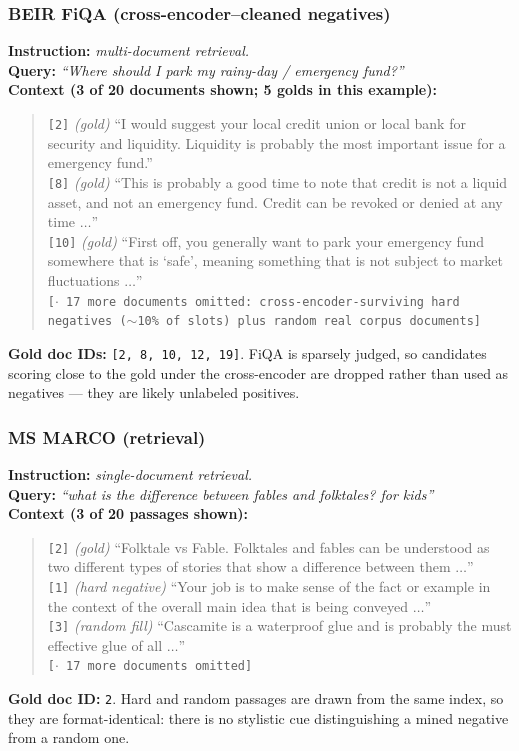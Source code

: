 \subsubsection{BEIR FiQA (cross-encoder--cleaned negatives)}

\textbf{Instruction:} \emph{multi-document retrieval.}\\
\textbf{Query:} \emph{``Where should I park my rainy-day / emergency fund?''}\\
\textbf{Context (3 of 20 documents shown; 5 golds in this example):}
\begin{quote}\small
\texttt{[2]} \emph{(gold)} ``I would suggest your local credit union or local bank for security and
liquidity. Liquidity is probably the most important issue for a emergency fund.''\\
\texttt{[8]} \emph{(gold)} ``This is probably a good time to note that credit is not a liquid asset,
and not an emergency fund. Credit can be revoked or denied at any time $\dots$''\\
\texttt{[10]} \emph{(gold)} ``First off, you generally want to park your emergency fund somewhere
that is `safe', meaning something that is not subject to market fluctuations $\dots$''\\
\texttt{[$\cdot$ 17 more documents omitted: cross-encoder-surviving hard negatives ($\sim$10\% of
slots) plus random real corpus documents]}
\end{quote}
\textbf{Gold doc IDs:} \texttt{[2, 8, 10, 12, 19]}. FiQA is sparsely judged, so candidates scoring
close to the gold under the cross-encoder are dropped rather than used as negatives --- they are
likely unlabeled positives.

\subsubsection{MS MARCO (retrieval)}

\textbf{Instruction:} \emph{single-document retrieval.}\\
\textbf{Query:} \emph{``what is the difference between fables and folktales? for kids''}\\
\textbf{Context (3 of 20 passages shown):}
\begin{quote}\small
\texttt{[2]} \emph{(gold)} ``Folktale vs Fable. Folktales and fables can be understood as two
different types of stories that show a difference between them $\dots$''\\
\texttt{[1]} \emph{(hard negative)} ``Your job is to make sense of the fact or example in the context
of the overall main idea that is being conveyed $\dots$''\\
\texttt{[3]} \emph{(random fill)} ``Cascamite is a waterproof glue and is probably the must effective
glue of all $\dots$''\\
\texttt{[$\cdot$ 17 more documents omitted]}
\end{quote}
\textbf{Gold doc ID:} \texttt{2}. Hard and random passages are drawn from the same index, so they are
format-identical: there is no stylistic cue distinguishing a mined negative from a random one.

